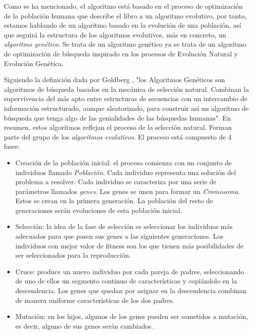 Como se ha mencionado, el algoritmo está basado en el proceso de optimización de la población humana que describe el libro 
a un algoritmo evolutivo, por tanto, estamos hablando de un algoritmo basado en la evolución de una población, así que seguirá 
la estructura de los algoritmos evolutivos, más en concreto, un \emph{algoritmo genético}. Se trata de un algoritmo 
genético ya se trata de un algoritmo de optimización de búsqueda inspirado en los procesos de Evolución Natural y
Evolución Genética.

Siguiendo la definición dada por Goldberg \cite{goldberg89}, "los Algoritmos Genéticos son algoritmos de búsqueda
basados en la mecánica de selección natural. Combinan la supervivencia del más apto entre estructuras de secuencias con un intercambio de 
información estructurado, aunque aleatorizado, para construir así un algoritmo de búsqueda que tenga algo de las genialidades de las 
búsquedas humanas". En resumen, estos algoritmos reflejan el proceso de la selección natural. Forman parte del grupo de 
los \emph{algoritmos evolutivos}. El proceso está compuesto de 4 fases:

\begin{itemize}
    \item Creación de la población inicial: el proceso comienza con un conjunto de individuos llamado \emph{Población}. Cada individuo
    representa una solución del problema a resolver. Cada individuo se caracteriza por una serie de parámetros llamados
    \emph{genes}. Los genes se unen para formar un \emph{Cromosoma}. Estos se crean en la primera generación. La población del 
    resto de generaciones serán evoluciones de esta población inicial.
    \item Selección: la idea de la fase de selección es seleccionar los individuos más adecuados para que pasen sus
    genes a las siguientes generaciones. Los individuos con mejor valor de fitness son los que tienen más posibilidades
    de ser seleccionados para la reproducción.
    \item Cruce: produce un nuevo individuo por cada pareja de padres, seleccionando de uno de ellos un segmento
    continuo de características y copiándolo en la descendencia. Los genes que quedan por asignar en la descendencia
    combinan de manera uniforme características de los dos padres.
    \item Mutación: en los hijos, algunos de los genes pueden ser sometidos a mutación, es decir, alguno de sus genes
    serán cambiados.
\end{itemize}

